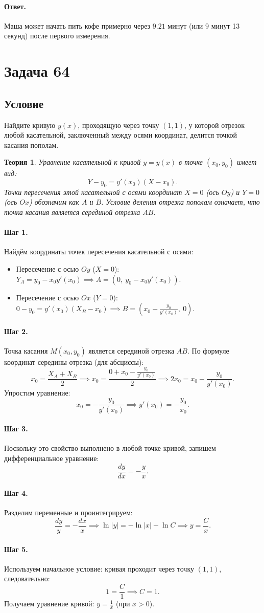 \documentclass[12pt,a4paper]{article}
\theoremstyle{solution}
\newtheorem*{theory}{Теория}
\newcommand{\task}[1]{\newpage\section*{Задача #1}}
\newcommand{\answer}{\paragraph{Ответ.}}
\newcommand{\step}[1]{\paragraph{Шаг #1.}}
\begin{document}
\answer
Маша может начать пить кофе примерно через $9.21$ минут (или 9 минут 13 секунд) после первого измерения.

\task{64}
\subsection*{Условие}
Найдите кривую $y(x)$, проходящую через точку $(1, 1)$, у которой отрезок любой касательной, заключенный между осями координат, делится точкой касания пополам.

\begin{theory}
Уравнение касательной к кривой $y = y(x)$ в точке $(x_0, y_0)$ имеет вид:
\[
Y - y_0 = y'(x_0)(X - x_0).
\]
Точки пересечения этой касательной с осями координат $X = 0$ (ось $Oy$) и $Y = 0$ (ось $Ox$) обозначим как $A$ и $B$. Условие деления отрезка пополам означает, что точка касания является серединой отрезка $AB$.
\end{theory}

\step{1} Найдём координаты точек пересечения касательной с осями:
\begin{itemize}
    \item Пересечение с осью $Oy$ ($X = 0$): \ $Y_A = y_0 - x_0 y'(x_0) \implies A = (0, \ y_0 - x_0 y'(x_0))$.
    \item Пересечение с осью $Ox$ ($Y = 0$): \ $0 - y_0 = y'(x_0)(X_B - x_0) \implies B = \left(x_0 - \frac{y_0}{y'(x_0)}, \ 0\right)$.
\end{itemize}

\step{2} Точка касания $M(x_0, y_0)$ является серединой отрезка $AB$. По формуле координат середины отрезка (для абсциссы):
\[
x_0 = \frac{X_A + X_B}{2} \implies x_0 = \frac{0 + x_0 - \frac{y_0}{y'(x_0)}}{2} \implies 2x_0 = x_0 - \frac{y_0}{y'(x_0)}.
\]
Упростим уравнение:
\[
x_0 = -\frac{y_0}{y'(x_0)} \implies y'(x_0) = -\frac{y_0}{x_0}.
\]

\step{3} Поскольку это свойство выполнено в любой точке кривой, запишем дифференциальное уравнение:
\[
\frac{dy}{dx} = -\frac{y}{x}.
\]

\step{4} Разделим переменные и проинтегрируем:
\[
\frac{dy}{y} = -\frac{dx}{x} \implies \ln|y| = -\ln|x| + \ln C \implies y = \frac{C}{x}.
\]

\step{5} Используем начальное условие: кривая проходит через точку $(1, 1)$, следовательно:
\[
1 = \frac{C}{1} \implies C = 1.
\]
Получаем уравнение кривой: $y = \frac{1}{x}$ (при $x > 0$).
\end{document}
